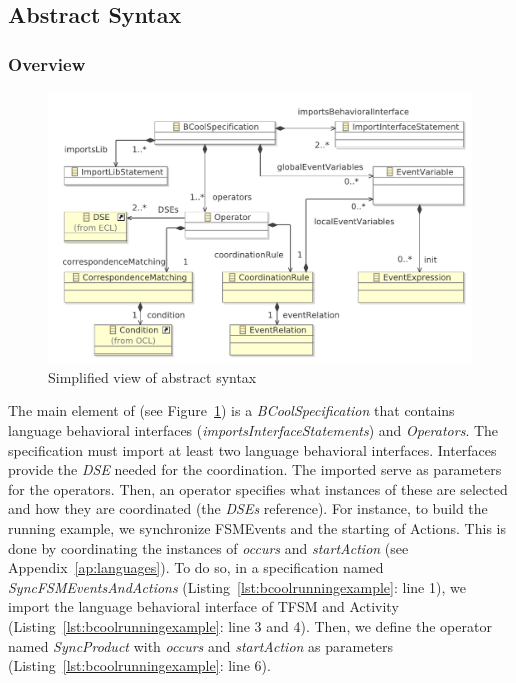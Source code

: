 \subsection{Abstract Syntax}
\subsubsection{Overview}
\begin{figure}
	\center
	\includegraphics[width=.8\textwidth]{bcool/figs/BcoolMM}
	\caption{Simplified view of \bcool abstract syntax}
	\label{fig:bcool}
\end{figure}

The main element of \bcool (see Figure~\ref{fig:bcool}) is a \emph{BCoolSpecification} that contains language behavioral interfaces (\emph{importsInterfaceStatements}) and \emph{Operators}. The specification must import at least two language behavioral interfaces. Interfaces provide the \emph{DSE} needed for the coordination. The imported \dse serve as parameters for the operators. Then, an operator specifies what instances of these \dse are selected and how they are coordinated (the \emph{DSEs} reference). For instance, to build the running example, we synchronize FSMEvents and the starting of Actions. This is done by coordinating the instances of \dse \emph{occurs} and \emph{startAction} (see Appendix~\ref{ap:languages}). To do so, in a \bcool specification named \emph{SyncFSMEventsAndActions} (Listing~\ref{lst:bcoolrunningexample}: line 1), we import the language behavioral interface of TFSM and Activity (Listing~\ref{lst:bcoolrunningexample}: line 3 and 4). Then, we define the operator named \emph{SyncProduct} with \emph{occurs} and \emph{startAction} as parameters  (Listing~\ref{lst:bcoolrunningexample}: line 6). 


